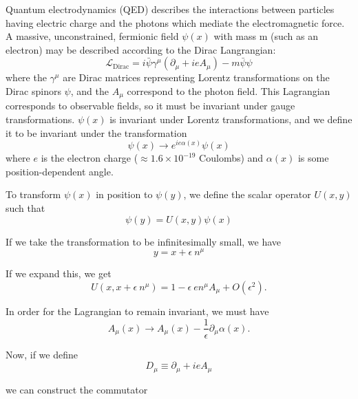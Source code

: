 Quantum electrodynamics (QED) describes the interactions between particles having electric charge and the photons which mediate the electromagnetic force. A massive, unconstrained, fermionic field $\psi(x)$ with mass m (such as an electron) may be described according to the Dirac Langrangian\cite{srednicki}:
\begin{equation}
\mathcal{L}_{\text{Dirac}} = i\bar{\psi}\gamma^{\mu}\left(\partial_{\mu} + ieA_{\mu}\right) - m\bar{\psi}\psi
\end{equation}
where the $\gamma^{\mu}$ are Dirac matrices representing Lorentz transformations on the Dirac spinors $\psi$, and the $A_{\mu}$ correspond to the photon field. This Lagrangian corresponds to observable fields, so it must be invariant under gauge transformations. $\psi(x)$ is invariant under Lorentz transformations, and we define it to be invariant under the transformation
\begin{equation}
\psi(x) \to e^{ie\alpha(x)}\psi(x)
\end{equation}
where $e$ is the electron charge ($\approx 1.6 \times 10^{-19}$ Coulombs) and $\alpha(x)$ is some position-dependent angle.

To transform $\psi(x)$ in position to $\psi(y)$, we define the scalar operator $U(x, y)$ such that
\begin{equation}
\psi(y) = U(x, y)\psi(x)
\end{equation}

\noindent If we take the transformation to be infinitesimally small, we have
\begin{equation}
y = x + \epsilon\ n^{\mu}
\end{equation}

\noindent If we expand this, we get
\begin{equation}
U(x, x + \epsilon\ n^{\mu}) = 1 - \epsilon\ en^{\mu}A_{\mu} + O(\epsilon^{2}).
\end{equation}

\noindent In order for the Lagrangian to remain invariant, we must have
\begin{equation}
A_{\mu}(x) \to A_{\mu}(x) - \frac{1}{\epsilon}\partial_{\mu}\alpha(x).
\end{equation}

\noindent Now, if we define
\begin{equation}
D_{\mu} \equiv \partial_{\mu} + ieA_{\mu}
\end{equation}

\noindent we can construct the commutator

